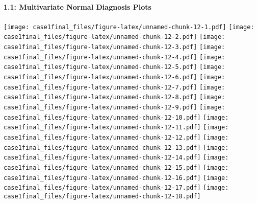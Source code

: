\documentclass[]{article}
\let\oldparagraph\paragraph
\renewcommand{\paragraph}[1]{\oldparagraph{#1}\mbox{}}
\begin{document}
\paragraph{1.1: Multivariate Normal Diagnosis
Plots}\label{multivariate-normal-diagnosis-plots}

\texttt{[image: case1final\_files/figure-latex/unnamed-chunk-12-1.pdf]}
\texttt{[image: case1final\_files/figure-latex/unnamed-chunk-12-2.pdf]}
\texttt{[image: case1final\_files/figure-latex/unnamed-chunk-12-3.pdf]}
\texttt{[image: case1final\_files/figure-latex/unnamed-chunk-12-4.pdf]}
\texttt{[image: case1final\_files/figure-latex/unnamed-chunk-12-5.pdf]}
\texttt{[image: case1final\_files/figure-latex/unnamed-chunk-12-6.pdf]}
\texttt{[image: case1final\_files/figure-latex/unnamed-chunk-12-7.pdf]}
\texttt{[image: case1final\_files/figure-latex/unnamed-chunk-12-8.pdf]}
\texttt{[image: case1final\_files/figure-latex/unnamed-chunk-12-9.pdf]}
\texttt{[image: case1final\_files/figure-latex/unnamed-chunk-12-10.pdf]}
\texttt{[image: case1final\_files/figure-latex/unnamed-chunk-12-11.pdf]}
\texttt{[image: case1final\_files/figure-latex/unnamed-chunk-12-12.pdf]}
\texttt{[image: case1final\_files/figure-latex/unnamed-chunk-12-13.pdf]}
\texttt{[image: case1final\_files/figure-latex/unnamed-chunk-12-14.pdf]}
\texttt{[image: case1final\_files/figure-latex/unnamed-chunk-12-15.pdf]}
\texttt{[image: case1final\_files/figure-latex/unnamed-chunk-12-16.pdf]}
\texttt{[image: case1final\_files/figure-latex/unnamed-chunk-12-17.pdf]}
\texttt{[image: case1final\_files/figure-latex/unnamed-chunk-12-18.pdf]}
\end{document}

